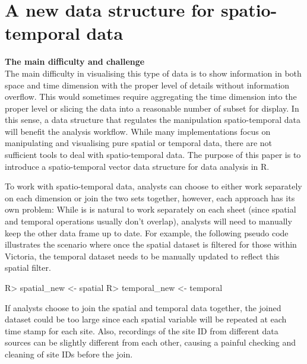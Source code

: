 \documentclass[
]{jss}
\begin{document}
\hypertarget{a-new-data-structure-for-spatio-temporal-data}{%
\section{A new data structure for spatio-temporal
data}\label{a-new-data-structure-for-spatio-temporal-data}}

\textbf{The main difficulty and challenge}\\
The main difficulty in visualising this type of data is to show
information in both space and time dimension with the proper level of
details without information overflow. This would sometimes require
aggregating the time dimension into the proper level or slicing the data
into a reasonable number of subset for display. In this sense, a data
structure that regulates the manipulation spatio-temporal data will
benefit the analysis workflow. While many implementations focus on
manipulating and visualising pure spatial or temporal data, there are
not sufficient tools to deal with spatio-temporal data. The purpose of
this paper is to introduce a spatio-temporal vector data structure for
data analysis in R.

To work with spatio-temporal data, analysts can choose to either work
separately on each dimension or join the two sets together, however,
each approach has its own problem: While is is natural to work
separately on each sheet (since spatial and temporal operations usually
don't overlap), analysts will need to manually keep the other data frame
up to date. For example, the following pseudo code illustrates the
scenario where once the spatial dataset is filtered for those within
Victoria, the temporal dataset needs to be manually updated to reflect
this spatial filter.

\begin{CodeChunk}
\begin{CodeInput}
R> spatial_new <- spatial %
R> temporal_new <- temporal %
\end{CodeInput}
\end{CodeChunk}

If analysts choose to join the spatial and temporal data together, the
joined dataset could be too large since each spatial variable will be
repeated at each time stamp for each site. Also, recordings of the site
ID from different data sources can be slightly different from each
other, causing a painful checking and cleaning of site IDs before the
join.
\end{document}

